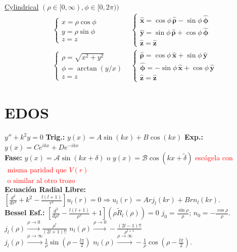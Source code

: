 \underline{Cylindrical}  $(\rho \in [0, \infty), \phi \in [0, 2\pi))$
\begin{align*}
&\begin{cases} 
x = \rho\cos\phi \\ 
y = \rho\sin\phi \\ 
z = z 
\end{cases} & 
\begin{cases} 
\mathbf{\hat{x}} = \cos\phi\,\bm{\hat{\rho}} - \sin\phi\,\bm{\hat{\phi}} \\ 
\mathbf{\hat{y}} = \sin\phi\,\bm{\hat{\rho}} + \cos\phi\,\bm{\hat{\phi}} \ \ \
\\ 
\mathbf{\hat{z}} = \mathbf{\hat{z}} 
\end{cases}
\\[0pt]
&\begin{cases} 
\rho = \sqrt{x^2+y^2} \\ 
\phi = \arctan(y/x) \\ 
z = z 
\end{cases}
&
\begin{cases} 
\bm{\hat{\rho}} = \cos\phi\,\mathbf{\hat{x}} + \sin\phi\,\mathbf{\hat{y}} \\ 
\bm{\hat{\phi}} = -\sin\phi\,\mathbf{\hat{x}} + \cos\phi\,\mathbf{\hat{y}} \\ 
\mathbf{\hat{z}} = \mathbf{\hat{z}} 
\end{cases}
\end{align*}


\section*{EDOS}
$y'' + k^2 y = 0$
 \textbf{Trig.:} $y(x) = A \sin(kx) + B \cos(kx)$
\textbf{Exp.:} $y(x) = C e^{ikx} + D e^{-ikx}$\\
 \textbf{Fase:} $y(x) = \mathcal{A} \sin(kx + \delta)$ o $y(x) = \mathcal{B} \cos(kx + \tilde{\delta})$ \textcolor{red}{escógela con \hspace{-2pt} $\begin{array}{cc}
      \text{misma paridad que $V(r)$} \\
       \text{o similar al otro trozo}
 \end{array}$}\\
\textbf{Ecuación Radial Libre:} $\left[\frac{d^2}{dr^2} + k^2 - \frac{l(l+1)}{r^2}\right] u_l(r) = 0 \Rightarrow u_l(r) = A r j_l(kr) + B r n_l(kr)$. \\

\textbf{Bessel Esf.:} $\left[\frac{d^2}{d\rho^2} - \frac{l(l+1)}{\rho^2}+1\right] (\rho \tilde{R}_l (\rho)) = 0$ \;\; 
$j_0 = \frac{\sin\rho}{\rho}$; $n_0 = -\frac{\cos\rho}{\rho}$. \\
$j_l(\rho) \xrightarrow{\rho \to 0} \frac{\rho^l}{(2l+1)!!}$ \;\; $n_l(\rho) \xrightarrow{\rho \to 0} -\frac{(2l-1)!!}{\rho^{l+1}}$ \\
$j_l(\rho) \xrightarrow{\rho \to \infty} \frac{1}{\rho} \sin\left(\rho - \frac{l\pi}{2}\right)$ \;\; 
$n_l(\rho) \xrightarrow{\rho \to \infty} -\frac{1}{\rho} \cos\left(\rho - \frac{l\pi}{2}\right)$. \\

